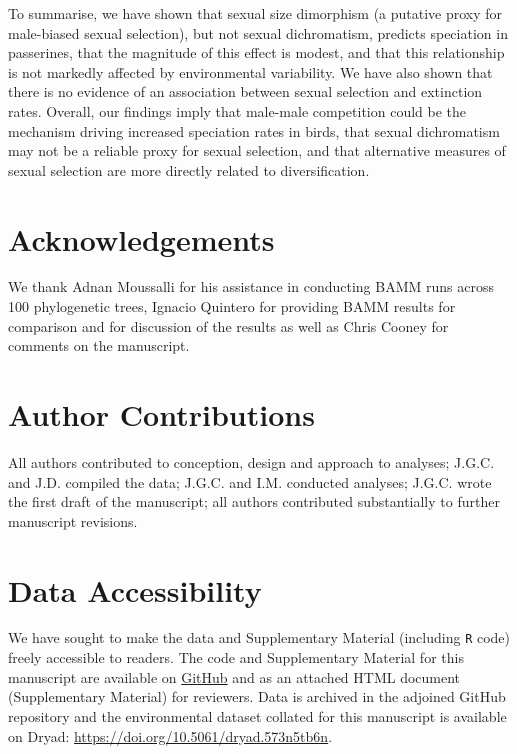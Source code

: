 \documentclass[]{article}
\begin{document}
To summarise, we have shown that sexual size dimorphism (a putative
proxy for male-biased sexual selection), but not sexual dichromatism,
predicts speciation in passerines, that the magnitude of this effect is
modest, and that this relationship is not markedly affected by
environmental variability. We have also shown that there is no evidence
of an association between sexual selection and extinction rates.
Overall, our findings imply that male-male competition could be the
mechanism driving increased speciation rates in birds, that sexual
dichromatism may not be a reliable proxy for sexual selection, and that
alternative measures of sexual selection are more directly related to
diversification.


\hypertarget{acknowledgements}{%
\section{Acknowledgements}\label{acknowledgements}}

We thank Adnan Moussalli for his assistance in conducting BAMM runs
across 100 phylogenetic trees, Ignacio Quintero for providing BAMM
results for comparison and for discussion of the results as well as
Chris Cooney for comments on the manuscript.


\hypertarget{author-contributions}{%
\section{Author Contributions}\label{author-contributions}}

All authors contributed to conception, design and approach to analyses;
J.G.C. and J.D. compiled the data; J.G.C. and I.M. conducted analyses;
J.G.C. wrote the first draft of the manuscript; all authors contributed
substantially to further manuscript revisions.


\hypertarget{data-accessibility}{%
\section{Data Accessibility}\label{data-accessibility}}

We have sought to make the data and Supplementary Material (including
\texttt{R} code) freely accessible to readers. The code and
Supplementary Material for this manuscript are available on
\href{https://justincally.github.io/SexualSelection_Speciation/}{GitHub}
and as an attached HTML document (Supplementary Material) for reviewers.
Data is archived in the adjoined GitHub repository and the environmental
dataset collated for this manuscript is available on Dryad:
\url{https://doi.org/10.5061/dryad.573n5tb6n}.
\end{document}
